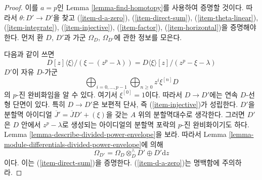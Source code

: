 \begin{proof}
이를 $a = p$인 Lemma \ref{lemma-find-homotopy}를 사용하여 증명할
것이다. 따라서 $\theta : D' \to D'$을 찾고
(\ref{item-d-a-zero}), (\ref{item-direct-sum}),
(\ref{item-theta-linear}), (\ref{item-integrate}),
(\ref{item-injective}), (\ref{item-factor}),
(\ref{item-horizontal})을 증명해야 한다. 먼저 환 $D$, $D'$과 가군
$\Omega_D$, $\Omega_{D'}$에 관한 정보를 모은다.

\medskip\noindent
다음과 같이 쓰면
$$
D[z]\langle \xi \rangle/(\xi - (z^p - \lambda))
=
D\langle \xi \rangle[z]/(z^p - \xi - \lambda)
$$
$D'$이 자유 $D$-가군
$$
\bigoplus\nolimits_{i = 0, \ldots, p - 1}
\bigoplus\nolimits_{n \geq 0}
z^i \xi^{[n]} D
$$
의 $p$-진 완비화임을 알 수 있다. 여기서 $\xi^{[0]} = 1$이다.
따라서 $D \to D'$에는 연속 $D$-선형 단면이 있다. 특히
$D \to D'$은 보편적 단사, 즉 (\ref{item-injective})가 성립한다.
$D'$을 분할멱 아이디얼
$\overline{J}' = \overline{J}D' + (\xi)$을 갖는 $A$ 위의 분할멱대수로
생각한다. 그러면 $D'$은 $D$ 안에서 $z^p - \lambda$로 생성되는
아이디얼의 분할멱 포락의 $p$-진 완비화이기도 하다. Lemma
\ref{lemma-describe-divided-power-envelope}을 보라. 따라서 Lemma
\ref{lemma-module-differentials-divided-power-envelope}에 의해
$$
\Omega_{D'} = \Omega_D \otimes_D^\wedge D' \oplus D'\text{d}z
$$
이다. 이는 (\ref{item-direct-sum})을 증명한다.
(\ref{item-d-a-zero})는 명백함에 주의하라.


\end{proof}
